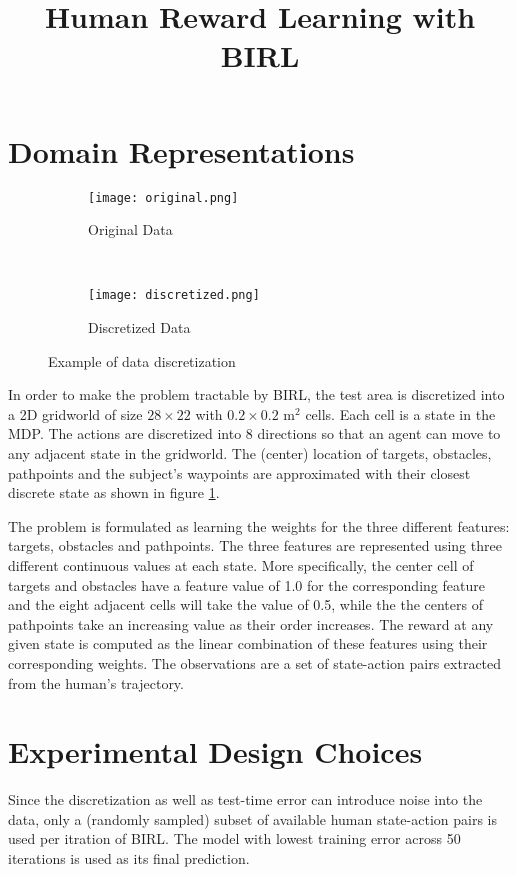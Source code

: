 \documentclass[12pt]{article}
\title{\LARGE \bf  Human Reward Learning with BIRL }
\begin{document}
\thispagestyle{fancy}
    \maketitle
    \pagestyle{fancy}

\section{Domain Representations}

\begin{figure}[h!]
    \centering
    \begin{subfigure}[h]{0.45\textwidth}
        \centering
        \texttt{[image: original.png]}
        \caption{Original Data}
    \end{subfigure}
    ~ 
    \begin{subfigure}[h]{0.45\textwidth}
        \centering
        \texttt{[image: discretized.png]}
        \caption{Discretized Data}
    \end{subfigure}
    \caption{Example of data discretization}
    \label{gridworld}
\end{figure}

In order to make the problem tractable by BIRL, the test area is discretized into a 2D gridworld of size $28\times 22$ with $0.2 \times 0.2$ $\text{m}^2$ cells. Each cell is a state in the MDP. The actions are discretized into 8 directions so that an agent can move to any adjacent state in the gridworld. The (center) location of targets, obstacles,  pathpoints and the subject's waypoints are approximated with their closest discrete state as shown in figure \ref{gridworld}. \par

The problem is formulated as learning the weights for the three different features: targets, obstacles and pathpoints. The three features are represented using three different continuous values at each state. More specifically, the center cell of targets and obstacles have a feature value of 1.0 for the corresponding feature and the eight adjacent cells will take the value of 0.5, while the the centers of pathpoints take an increasing value as their order increases. The reward at any given state is computed as the linear combination of these features using their corresponding weights. The observations are a set of state-action pairs extracted from the human's trajectory. \par

\section{Experimental Design Choices}
Since the discretization as well as test-time error can introduce noise into the data, only a (randomly sampled) subset of available human state-action pairs is used per itration of BIRL. The model with lowest training error across 50 iterations is used as its final prediction. \par
\end{document}
